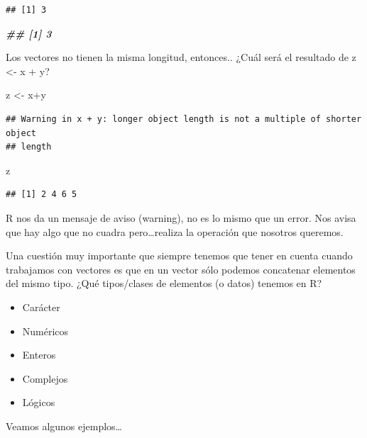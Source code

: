 \documentclass[
]{book}
\newenvironment{Shaded}{\begin{snugshade}}{\end{snugshade}}
\newcommand{\DocumentationTok}[1]{\textcolor[rgb]{0.56,0.35,0.01}{\textbf{\textit{#1}}}}
\newcommand{\NormalTok}[1]{#1}
\newcommand{\OtherTok}[1]{\textcolor[rgb]{0.56,0.35,0.01}{#1}}
\newcommand{\SpecialCharTok}[1]{\textcolor[rgb]{0.00,0.00,0.00}{#1}}
\begin{document}
\begin{verbatim}
## [1] 3
\end{verbatim}

\begin{Shaded}
\begin{Highlighting}[]
\DocumentationTok{\#\# [1] 3}
\end{Highlighting}
\end{Shaded}

Los vectores no tienen la misma longitud, entonces.. ¿Cuál será el resultado de z \textless- x + y?

\begin{Shaded}
\begin{Highlighting}[]
\NormalTok{z }\OtherTok{\textless{}{-}}\NormalTok{ x}\SpecialCharTok{+}\NormalTok{y}
\end{Highlighting}
\end{Shaded}

\begin{verbatim}
## Warning in x + y: longer object length is not a multiple of shorter object
## length
\end{verbatim}

\begin{Shaded}
\begin{Highlighting}[]
\NormalTok{z}
\end{Highlighting}
\end{Shaded}

\begin{verbatim}
## [1] 2 4 6 5
\end{verbatim}

R nos da un mensaje de aviso (warning), no es lo mismo que un error. Nos avisa que hay algo que no cuadra pero\ldots realiza la operación que nosotros queremos.

Una cuestión muy importante que siempre tenemos que tener en cuenta cuando trabajamos con vectores es que en un vector sólo podemos concatenar elementos del mismo tipo. ¿Qué tipos/clases de elementos (o datos) tenemos en R?

\begin{itemize}
\item
  Carácter
\item
  Numéricos
\item
  Enteros
\item
  Complejos
\item
  Lógicos
\end{itemize}

Veamos algunos ejemplos\ldots{}
\end{document}
